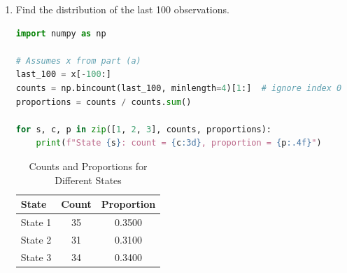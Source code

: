 \documentclass[dvipsnames,11pt]{article}
\begin{document}
\begin{enumerate}[label=\alph*.]
\begin{solution}
            \end{solution}
            
        \item Find the distribution of the last 100 observations.

            \begin{solution}
    
\begin{lstlisting}[language=python]
import numpy as np

# Assumes x from part (a)
last_100 = x[-100:]
counts = np.bincount(last_100, minlength=4)[1:]  # ignore index 0
proportions = counts / counts.sum()

for s, c, p in zip([1, 2, 3], counts, proportions):
    print(f"State {s}: count = {c:3d}, proportion = {p:.4f}")
\end{lstlisting}

                \begin{table}[h]
                    \centering
                    \begin{tabular}{lcc}
                        \hline
                        \textbf{State} & \textbf{Count} & \textbf{Proportion} \\
                        \hline
                        State 1 & 35 & 0.3500 \\
                        State 2 & 31 & 0.3100 \\
                        State 3 & 34 & 0.3400 \\
                        \hline
                    \end{tabular}
                    \caption{Counts and Proportions for Different States}
                    \label{tab:state_counts_proportions}
                \end{table}

            \end{solution}
            
    \end{enumerate}
\end{document}
